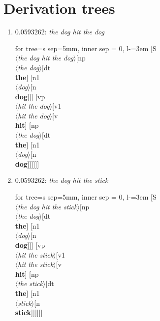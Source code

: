 \documentclass[11pt]{article}
\begin{document}
\section{Derivation trees}
\begin{enumerate}
	\item  0.0593262: \textit{the dog hit the dog} \\[0.5em]
	\begin{adjustbox}{max width = \textwidth}
	\begin{forest}
	for tree={s sep=5mm, inner sep = 0, l-=3em}
	[S\\$\langle$\textit{the dog hit the dog}$\rangle$[np\\$\langle$\textit{the dog}$\rangle$[dt\\\textbf{the}] [n1\\$\langle$\textit{dog}$\rangle$[n\\\textbf{dog}]]] [vp\\$\langle$\textit{hit the dog}$\rangle$[v1\\$\langle$\textit{hit the dog}$\rangle$[v\\\textbf{hit}] [np\\$\langle$\textit{the dog}$\rangle$[dt\\\textbf{the}] [n1\\$\langle$\textit{dog}$\rangle$[n\\\textbf{dog}]]]]]]
	\end{forest}
	\end{adjustbox}
	\newpage

	\item  0.0593262: \textit{the dog hit the stick} \\[0.5em]
	\begin{adjustbox}{max width = \textwidth}
	\begin{forest}
	for tree={s sep=5mm, inner sep = 0, l-=3em}
	[S\\$\langle$\textit{the dog hit the stick}$\rangle$[np\\$\langle$\textit{the dog}$\rangle$[dt\\\textbf{the}] [n1\\$\langle$\textit{dog}$\rangle$[n\\\textbf{dog}]]] [vp\\$\langle$\textit{hit the stick}$\rangle$[v1\\$\langle$\textit{hit the stick}$\rangle$[v\\\textbf{hit}] [np\\$\langle$\textit{the stick}$\rangle$[dt\\\textbf{the}] [n1\\$\langle$\textit{stick}$\rangle$[n\\\textbf{stick}]]]]]]
	\end{forest}
	\end{adjustbox}
	\newpage


\end{enumerate}
\end{document}
